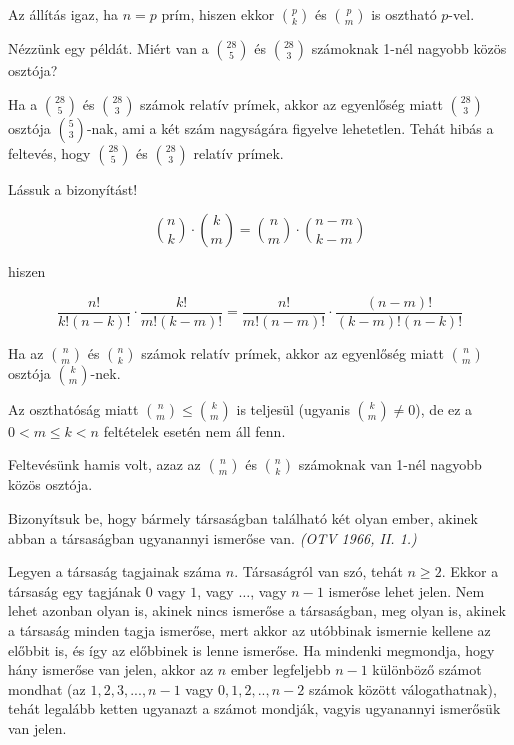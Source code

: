 \begin{solution}

Az állítás igaz, ha $n=p$ prím, hiszen ekkor $\binom{p}{k}$ és $\binom{p}{m}$
is osztható $p$-vel.

Nézzünk egy példát. Miért van a $\binom{28}{5}$ és $\binom{28}{3}$
számoknak 1-nél nagyobb közös osztója?

Ha a $\binom{28}{5}$ és $\binom{28}{3}$ számok relatív prímek, akkor
az egyenlőség miatt $\binom{28}{3}$ osztója $\binom{5}{3}$-nak,
ami a két szám nagyságára figyelve lehetetlen. Tehát hibás a feltevés,
hogy $\binom{28}{5}$ és $\binom{28}{3}$ relatív prímek.

Lássuk a bizonyítást!

\[
\binom{n}{k}\cdot\binom{k}{m}=\binom{n}{m}\cdot\binom{n-m}{k-m}
\]

hiszen

\[
\frac{n!}{k!(n-k)!}\cdot\frac{k!}{m!(k-m)!}=\frac{n!}{m!(n-m)!}\cdot\frac{(n-m)!}{(k-m)!(n-k)!}
\]

Ha az $\binom{n}{m}$ és $\binom{n}{k}$ számok relatív prímek, akkor
az egyenlőség miatt $\binom{n}{m}$ osztója $\binom{k}{m}$-nek.

Az oszthatóság miatt $\binom{n}{m}\leq\binom{k}{m}$ is teljesül (ugyanis
$\binom{k}{m}\neq0$), de ez a $0<m\leq k<n$ feltételek esetén nem
áll fenn.

Feltevésünk hamis volt, azaz az $\binom{n}{m}$ és $\binom{n}{k}$
számoknak van 1-nél nagyobb közös osztója.
\end{solution}
\begin{extraproblem}
 Bizonyítsuk be, hogy bármely társaságban található két olyan ember,
akinek abban a társaságban ugyanannyi ismerőse van. \emph{(OTV 1966,
II. 1.)}
\end{extraproblem}

\begin{solution}
Legyen a társaság tagjainak száma $n$. Társaságról van szó, tehát
$n\geq2$. Ekkor a társaság egy tagjának $0$ vagy $1$, vagy $\ldots$,
vagy $n-1$ ismerőse lehet jelen. Nem lehet azonban olyan is, akinek
nincs ismerőse a társaságban, meg olyan is, akinek a társaság minden
tagja ismerőse, mert akkor az utóbbinak ismernie kellene az előbbit
is, és így az előbbinek is lenne ismerőse. Ha mindenki megmondja,
hogy hány ismerőse van jelen, akkor az $n$ ember legfeljebb $n-1$
különböző számot mondhat (az $1,2,3,...,n-1$ vagy $0,1,2,..,n-2$
számok között válogathatnak), tehát legalább ketten ugyanazt a számot
mondják, vagyis ugyanannyi ismerősük van jelen.
\end{solution}


